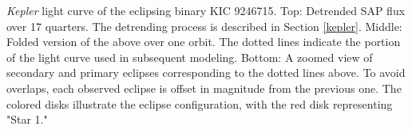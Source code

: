 \label{fig:keplerfig} \emph{Kepler} light curve of the eclipsing binary KIC 9246715. Top: Detrended SAP flux over 17 quarters. The detrending process is described in Section \ref{kepler}. Middle: Folded version of the above over one orbit. The dotted lines indicate the portion of the light curve used in subsequent modeling. Bottom: A zoomed view of secondary and primary eclipses corresponding to the dotted lines above. To avoid overlaps, each observed eclipse is offset in magnitude from the previous one. The colored disks illustrate the eclipse configuration, with the red disk representing "Star 1." 
